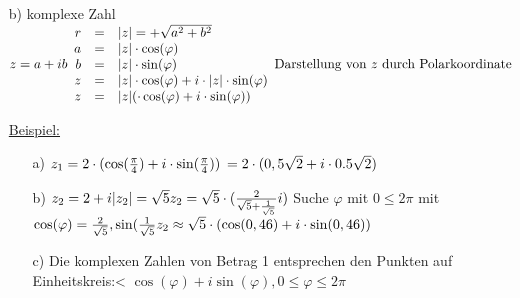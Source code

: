 \begin{enumerate}
\\
  Umfang:$2\pi$\\
  $\varphi$ in Grad $\widehat{=} \frac{2\pi \cd \varphi}{360}$ im Bogenma\ss\\
   F\"ur Punkte mit kartesischen Koordinaten (0,0) werden als Polarkoordinate $(r,\varphi)$ verwendet.
\item[b)]komplexe Zahl $z = a +ib\\
\begin{array}{rcl}
r &=& \lvert z \rvert = + \sqrt{a^2+b^2}\\
a &=& \lvert z \rvert \cdot \cos(\varphi)\\
b &=& \lvert z \rvert \cdot \sin(\varphi)\\
z &=& \lvert z \rvert \cdot \cos(\varphi) + i \cdot \lvert z \rvert \cdot \sin(\varphi)\\
z &=& \lvert z \rvert( \cdot \cos(\varphi) + i \cdot \sin(\varphi))\\
\end{array}\\
\text{Darstellung von $z$ durch Polarkoordinate}$
\item[\underline{Beispiel:}]\begin{enumerate}
\item[a)]$z_1 = 2 \cdot (\cos(\frac{\pi}{4})+i \cdot \sin(\frac{\pi}{4}))\\
\hspace*{2pt}= 2 \cdot (0,5\sqrt{2}+i \cdot 0.5\sqrt{2})$
\item[b)]$z_2 = 2+i\\
\lvert z_2 \rvert = \sqrt{5}\\
z_2 = \sqrt{5} \cdot (\frac{2}{\sqrt{5} + \frac{1}{\sqrt{5}}}i)$
Suche $\varphi$ mit $0 \leq 2\pi$ mit $\cos(\varphi) =\frac{2}{\sqrt{5}}, \sin(\frac{1}{\sqrt{5}} z_2 \approx \sqrt{5} \cdot (\cos(0,46) + i \cdot \sin(0,46))$
\item[c)] Die komplexen Zahlen von Betrag 1 entsprechen den Punkten auf Einheitskreis:<
$\cos(\varphi) + i \sin(\varphi), 0  \leq \varphi \leq 2\pi$
\end{enumerate}
\end{enumerate}
